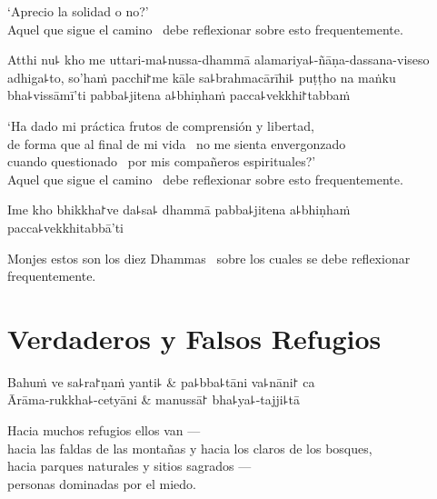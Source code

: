 \begin{english}
  `Aprecio la solidad o no?' \pause\\
  Aquel que sigue el camino \pause\ debe reflexionar sobre esto frequentemente.
\end{english}

Atthi nu꜕ kho me uttari-ma꜕nussa-dhammā alamariya꜕-ñāṇa-dassana-viseso adhiga꜕to, so'haṁ pacchi꜓me kāle sa꜕brahmacārīhi꜕ puṭṭho na maṅku bha꜕vissāmī'ti pabba꜕jitena a꜕bhiṇhaṁ pacca꜕vekkhi꜓tabbaṁ

\begin{english}
  `Ha dado mi práctica frutos de comprensión y libertad, \pause\\ de forma que
  al final de mi vida \pause\ no me sienta envergonzado \pause\\
  cuando questionado \pause\ por mis compañeros espirituales?' \pause\\
  Aquel que sigue el camino \pause\ debe reflexionar sobre esto frequentemente.
\end{english}

Ime kho bhikkha꜓ve da꜕sa꜕ dhammā pabba꜕jitena a꜕bhiṇhaṁ pacca꜕vekkhitabbā'ti

\begin{english}
  Monjes estos son los diez Dhammas \pause\ sobre los cuales se debe reflexionar frequentemente.
\end{english}

\chapter{Verdaderos y Falsos Refugios}


\begin{leader}
\end{leader}

\begin{twochants}
  Bahuṁ ve sa꜕ra꜓ṇaṁ yanti꜕ & pa꜕bba꜕tāni va꜕nāni꜓ ca \\
  Ārāma-rukkha꜕-cetyāni & manussā꜓ bha꜕ya꜕-tajji꜕tā \\
\end{twochants}

\begin{english}
  Hacia muchos refugios ellos van ---\\
  hacia las faldas de las montañas y hacia los claros de los bosques,\\
  hacia parques naturales y sitios sagrados ---\\
  personas dominadas por el miedo.
\end{english}

